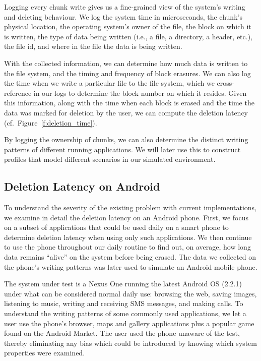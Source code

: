 \documentclass{acmtog}
\begin{document}
Logging every chunk write gives us a fine-grained view of the system's writing
and deleting behaviour. We log the system time in microseconds,
the chunk's physical location, the operating system's owner of
the file, the block on which it is written, the type of data being
written (i.e., a file, a directory, a header, etc.), the file id, and where in the
file the data is being written.

With the collected information, we can determine how much data is
written to the file system, and the timing and frequency of block
erasures. We can also log the time when we write a particular file to
the file system, which we cross-reference in our logs to determine the
block number on which it resides. Given this information, along with
the time when each block is erased and the time the data was marked for
deletion by the user, we can compute the deletion latency (cf.~Figure~\ref{f:deletion_time}).

By logging the ownership of chunks, we can also determine the distinct
writing patterns of different running applications. We will later use
this to construct profiles that model different scenarios in our
simulated environment.

\subsection{Deletion Latency on Android}

\label{s:deletion_android}


To understand the severity of the existing problem with current
implementations, we examine in detail the deletion latency
on an Android phone. First, we focus on a subset of
applications that could be used daily on a smart phone to determine deletion
latency when using only such applications. We then continue to use the phone
throughout our daily routine to find out, on average, how long data
remains ``alive'' on the system before being erased. The data we collected on
the phone's writing patterns was later used to simulate an Android mobile phone.

The system under test is a Nexus One running the latest Android OS
(2.2.1) under what can be considered normal daily use: browsing the
web, saving images, listening to music, writing and receiving SMS
messages, and making calls. 
To understand the writing patterns of some commonly used applications,
we let a user use the phone's browser, maps and gallery
applications plus a popular game found on the Android Market. The user
used the phone unaware of the test, thereby eliminating
any bias which could be introduced by knowing which system properties
were examined.
\end{document}
